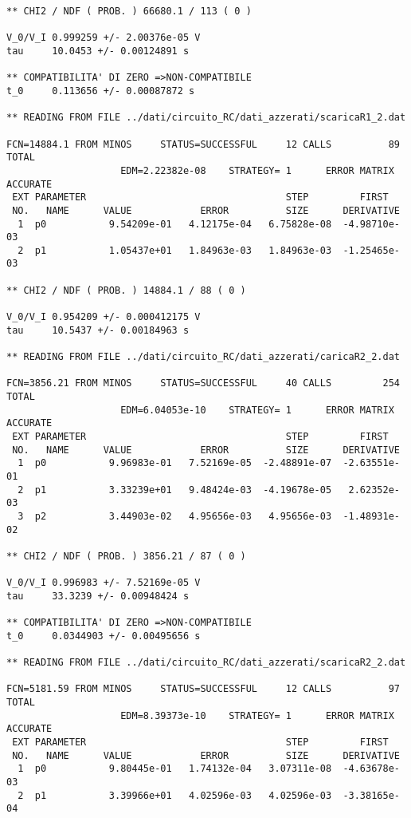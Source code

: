 {\begin{verbatim}
** CHI2 / NDF ( PROB. ) 66680.1 / 113 ( 0 )

V_0/V_I 0.999259 +/- 2.00376e-05 V
tau     10.0453 +/- 0.00124891 s

** COMPATIBILITA' DI ZERO =>NON-COMPATIBILE
t_0     0.113656 +/- 0.00087872 s

** READING FROM FILE ../dati/circuito_RC/dati_azzerati/scaricaR1_2.dat

FCN=14884.1 FROM MINOS     STATUS=SUCCESSFUL     12 CALLS          89 TOTAL
                    EDM=2.22382e-08    STRATEGY= 1      ERROR MATRIX ACCURATE 
 EXT PARAMETER                                   STEP         FIRST   
 NO.   NAME      VALUE            ERROR          SIZE      DERIVATIVE 
  1  p0           9.54209e-01   4.12175e-04   6.75828e-08  -4.98710e-03
  2  p1           1.05437e+01   1.84963e-03   1.84963e-03  -1.25465e-03

** CHI2 / NDF ( PROB. ) 14884.1 / 88 ( 0 )

V_0/V_I 0.954209 +/- 0.000412175 V
tau     10.5437 +/- 0.00184963 s

** READING FROM FILE ../dati/circuito_RC/dati_azzerati/caricaR2_2.dat

FCN=3856.21 FROM MINOS     STATUS=SUCCESSFUL     40 CALLS         254 TOTAL
                    EDM=6.04053e-10    STRATEGY= 1      ERROR MATRIX ACCURATE 
 EXT PARAMETER                                   STEP         FIRST   
 NO.   NAME      VALUE            ERROR          SIZE      DERIVATIVE 
  1  p0           9.96983e-01   7.52169e-05  -2.48891e-07  -2.63551e-01
  2  p1           3.33239e+01   9.48424e-03  -4.19678e-05   2.62352e-03
  3  p2           3.44903e-02   4.95656e-03   4.95656e-03  -1.48931e-02

** CHI2 / NDF ( PROB. ) 3856.21 / 87 ( 0 )

V_0/V_I 0.996983 +/- 7.52169e-05 V
tau     33.3239 +/- 0.00948424 s

** COMPATIBILITA' DI ZERO =>NON-COMPATIBILE
t_0     0.0344903 +/- 0.00495656 s

** READING FROM FILE ../dati/circuito_RC/dati_azzerati/scaricaR2_2.dat

FCN=5181.59 FROM MINOS     STATUS=SUCCESSFUL     12 CALLS          97 TOTAL
                    EDM=8.39373e-10    STRATEGY= 1      ERROR MATRIX ACCURATE 
 EXT PARAMETER                                   STEP         FIRST   
 NO.   NAME      VALUE            ERROR          SIZE      DERIVATIVE 
  1  p0           9.80445e-01   1.74132e-04   3.07311e-08  -4.63678e-03
  2  p1           3.39966e+01   4.02596e-03   4.02596e-03  -3.38165e-04


\end{verbatim}}

